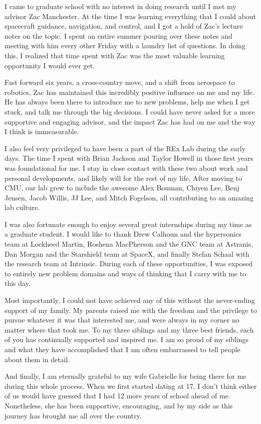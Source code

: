\documentclass[12pt]{cmuthesis}
\begin{document}
\begin{acknowledgments}
I came to graduate school with no interest in doing research until I met my advisor Zac Manchester. At the time I was learning everything that I could about spacecraft guidance, navigation, and control, and I got a hold of Zac's lecture notes on the topic. I spent an entire summer pouring over these notes and meeting with him every other Friday with a laundry list of questions. In doing this, I realized that time spent with Zac was the most valuable learning opportunity I would ever get.

Fast forward six years, a cross-country move, and a shift from aerospace to robotics, Zac has maintained this incredibly positive influence on me and my life.  He has always been there to introduce me to new problems, help me when I get stuck, and talk me through the big decisions. I could have never asked for a more supportive and engaging advisor, and the impact Zac has had on me and the way I think is immeasurable. 

I also feel very privileged to have been a part of the REx Lab during the early days. The time I spent with Brian Jackson and Taylor Howell in those first years was foundational for me.  I stay in close contact with these two about work and personal developments, and likely will for the rest of my life. After moving to CMU, our lab grew to include the awesome Alex Bouman, Chiyen Lee, Benj Jensen, Jacob Willis, JJ Lee, and Mitch Fogelson, all contributing to an amazing lab culture.

I was also fortunate enough to enjoy several great internships during my time as a graduate student. I would like to thank Drew Calhoun and the hypersonics team at Lockheed Martin, Roshena MacPherson and the GNC team at Astranis, Dan Morgan and the Starshield team at SpaceX, and finally Stefan Schaal with the research team at Intrinsic. During each of these opportunities, I was exposed to entirely new problem domains and ways of thinking that I carry with me to this day.

Most importantly, I could not have achieved any of this without the never-ending support of my family. My parents raised me with the freedom and the privilege to pursue whatever it was that interested me, and were always in my corner no matter where that took me. To my three siblings and my three best friends, each of you has continually supported and inspired me. I am so proud of my siblings and what they have accomplished that I am often embarrassed to tell people about them in detail.

And finally, I am eternally grateful to my wife Gabrielle for being there for me during this whole process. When we first started dating at 17, I don't think either of us would have guessed that I had 12 more years of school ahead of me.  Nonetheless, she has been supportive, encouraging, and by my side as this journey has brought me all over the country. 


\end{acknowledgments}
\restoregeometry
\end{document}

